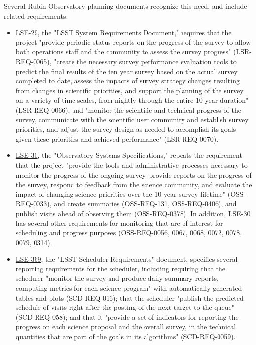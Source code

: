 Several Rubin Observatory planning documents recognize this need, and include related requirements:
\begin{itemize}
\item \href{https://ls.st/lse-29}{LSE-29}, the "LSST System Requirements Document," requires that the project "provide periodic status reports on the progress of the survey to allow both operations staff and the community to assess the survey progress" (LSR-REQ-0065), "create the necessary survey performance evaluation tools to predict the final results of the ten year survey based on the actual survey completed to date, assess the impacts of survey strategy changes resulting from changes in scientific priorities, and support the planning of the survey on a variety of time scales, from nightly through the entire 10 year duration" (LSR-REQ-0066), and "monitor the scientific and technical progress of the survey, communicate with the scientific user community and establish survey priorities, and adjust the survey design as needed to accomplish its goals given these priorities and achieved performance" (LSR-REQ-0070). %
\item \href{https://ls.st/lse-30}{LSE-30}, the "Observatory Systems Specifications," repeats the requirement that the project "provide the tools and administrative processes necessary to monitor the progress of the ongoing survey, provide reports on the progress of the survey, respond to feedback from the science community, and evaluate the impact of changing science priorities over the 10 year survey lifetime" (OSS-REQ-0033), and create summaries (OSS-REQ-131, OSS-REQ-0406), and publish visits ahead of observing them (OSS-REQ-0378). In addition, LSE-30 has several other requirements for monitoring that are of interest for scheduling and progress purposes (OSS-REQ-0056, 0067, 0068, 0072, 0078, 0079, 0314).
\item \href{https://ls.st/lse-369}{LSE-369}, the "LSST Scheduler Requirements" document, specifies several reporting requirements for the scheduler, including requiring that the scheduler "monitor the survey and produce daily summary reports, computing metrics for each science program" with automatically generated tables and plots (SCD-REQ-016); that the scheduler "publish the predicted schedule of visits right after the posting of the next target to the queue" (SCD-REQ-058); and that it "provide a set of indicators for reporting the progress on each science proposal and the overall survey, in the technical quantities that are part of the goals in its algorithms" (SCD-REQ-0059). 

\end{itemize}
